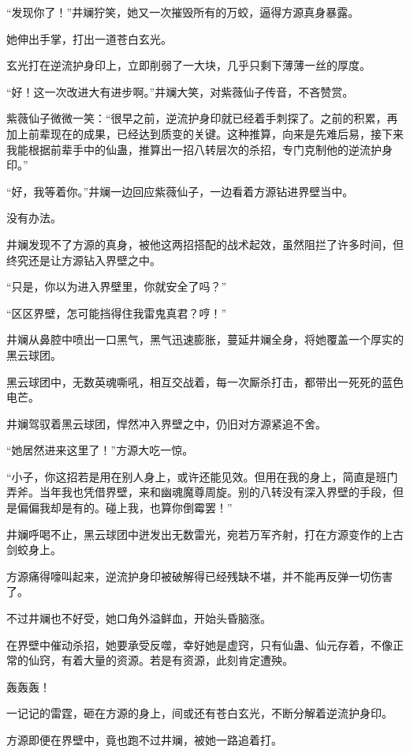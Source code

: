 \begin{this_body}
“发现你了！”井斓狞笑，她又一次摧毁所有的万蛟，逼得方源真身暴露。

她伸出手掌，打出一道苍白玄光。

玄光打在逆流护身印上，立即削弱了一大块，几乎只剩下薄薄一丝的厚度。

“好！这一次改进大有进步啊。”井斓大笑，对紫薇仙子传音，不吝赞赏。

紫薇仙子微微一笑：“很早之前，逆流护身印就已经着手刺探了。之前的积累，再加上前辈现在的成果，已经达到质变的关键。这种推算，向来是先难后易，接下来我能根据前辈手中的仙蛊，推算出一招八转层次的杀招，专门克制他的逆流护身印。”

“好，我等着你。”井斓一边回应紫薇仙子，一边看着方源钻进界壁当中。

没有办法。

井斓发现不了方源的真身，被他这两招搭配的战术起效，虽然阻拦了许多时间，但终究还是让方源钻入界壁之中。

“只是，你以为进入界壁里，你就安全了吗？”

“区区界壁，怎可能挡得住我雷鬼真君？哼！”

井斓从鼻腔中喷出一口黑气，黑气迅速膨胀，蔓延井斓全身，将她覆盖一个厚实的黑云球团。

黑云球团中，无数英魂嘶吼，相互交战着，每一次厮杀打击，都带出一死死的蓝色电芒。

井斓驾驭着黑云球团，悍然冲入界壁之中，仍旧对方源紧追不舍。

“她居然进来这里了！”方源大吃一惊。

“小子，你这招若是用在别人身上，或许还能见效。但用在我的身上，简直是班门弄斧。当年我也凭借界壁，来和幽魂魔尊周旋。别的八转没有深入界壁的手段，但是偏偏我却是有的。碰上我，也算你倒霉罢！”

井斓呼喝不止，黑云球团中迸发出无数雷光，宛若万军齐射，打在方源变作的上古剑蛟身上。

方源痛得嚎叫起来，逆流护身印被破解得已经残缺不堪，并不能再反弹一切伤害了。

不过井斓也不好受，她口角外溢鲜血，开始头昏脑涨。

在界壁中催动杀招，她要承受反噬，幸好她是虚窍，只有仙蛊、仙元存着，不像正常的仙窍，有着大量的资源。若是有资源，此刻肯定遭殃。

轰轰轰！

一记记的雷霆，砸在方源的身上，间或还有苍白玄光，不断分解着逆流护身印。

方源即便在界壁中，竟也跑不过井斓，被她一路追着打。


\end{this_body}
